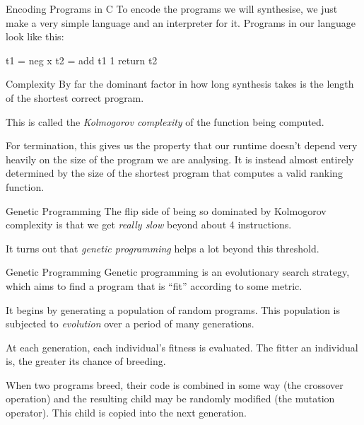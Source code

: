 \documentclass[xcolor=pdftex,t,11pt]{beamer}
\begin{document}
\begin{frame}[fragile]{Encoding Programs in C}
 To encode the programs we will synthesise, we just make a very simple language and an interpreter for it.  Programs
 in our language look like this:

 \vspace{0.7cm}

\begin{center}
\begin{minipage}{0.3\linewidth}
\begin{verbatimtab}
t1 = neg x
t2 = add t1 1
return t2
\end{verbatimtab}
\end{minipage}
\end{center}

\end{frame}

\fi

\begin{frame}{Complexity}
By far the dominant factor in how long synthesis takes is the length of the shortest correct program.

\vspace{1em}

This is called the \emph{Kolmogorov complexity} of the function being computed.

\vspace{1em}

For termination, this gives us the property that our runtime doesn't depend very heavily
on the size of the program we are analysing.  It is instead almost entirely determined by the
size of the shortest program that computes a valid ranking function.
\end{frame}


\begin{frame}{Genetic Programming}
The flip side of being so dominated by Kolmogorov complexity is that we
get \emph{really slow} beyond about 4 instructions.

\vspace{1em}

It turns out that \emph{genetic programming} helps a lot beyond this threshold.
\end{frame}

\begin{frame}{Genetic Programming}
Genetic programming is an evolutionary search strategy, which aims to find a program
that is ``fit'' according to some metric.

\vspace{1em}

It begins by generating a population of random programs.  This population is subjected to
\emph{evolution} over a period of many generations.

\vspace{1em}

At each generation, each individual's fitness is evaluated.  The fitter an individual is,
the greater its chance of breeding.

When two programs breed, their code is combined in some way (the crossover operation) and
the resulting child may be randomly modified (the mutation operator).  This child is copied
into the next generation.
\end{frame}
\end{document}
